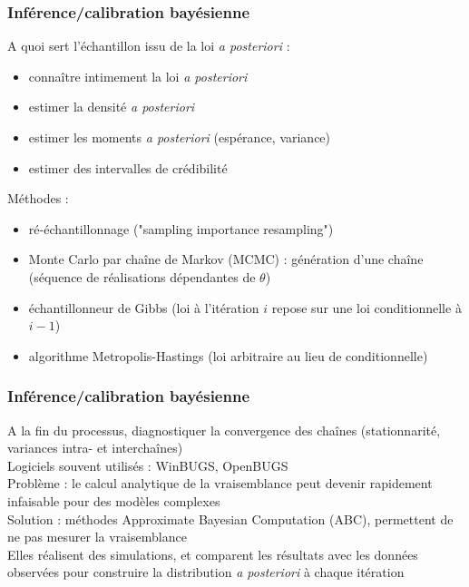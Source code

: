 \documentclass[10pt]{beamer}
\begin{document}
\begin{frame}
\frametitle{Inférence/calibration bayésienne}

A quoi sert l'échantillon issu de la loi \textit{a posteriori} :
\begin{itemize}
	\item connaître intimement la loi \textit{a posteriori}
	\item estimer la densité \textit{a posteriori}
	\item estimer les moments \textit{a posteriori} (espérance, variance)
	\item estimer des intervalles de crédibilité
\end{itemize}

Méthodes :
\begin{itemize}
	\item ré-échantillonnage ("sampling importance resampling")
	\item Monte Carlo par chaîne de Markov (MCMC) : génération d'une chaîne (séquence de réalisations dépendantes de $ \theta $)
	\item échantillonneur de Gibbs (loi à l'itération $ i $ repose sur une loi conditionnelle à $ i-1 $)
	\item algorithme Metropolis-Hastings (loi arbitraire au lieu de conditionnelle)
\end{itemize}

\end{frame}

\begin{frame}
\frametitle{Inférence/calibration bayésienne}

A la fin du processus, diagnostiquer la convergence des chaînes (stationnarité, variances intra- et interchaînes)\\
\medskip
Logiciels souvent utilisés : WinBUGS, OpenBUGS\\
\medskip
Problème : le calcul analytique de la vraisemblance peut devenir rapidement infaisable pour des modèles complexes\\
\medskip
Solution : méthodes Approximate Bayesian Computation (ABC), permettent de ne pas mesurer la vraisemblance\\
\medskip
Elles réalisent des simulations, et comparent les résultats avec les données observées pour construire la distribution \textit{a posteriori} à chaque itération

\end{frame}
\end{document}
